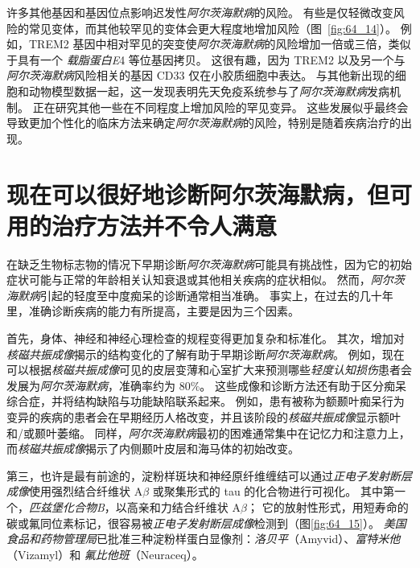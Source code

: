 许多其他基因和基因位点影响迟发性\textit{阿尔茨海默病}的风险。
有些是仅轻微改变风险的常见变体，而其他较罕见的变体会更大程度地增加风险（图~\ref{fig:64_14}）。
例如，TREM2 基因中相对罕见的突变使\textit{阿尔茨海默病}的风险增加一倍或三倍，类似于具有一个 \textit{载脂蛋白E}4 等位基因拷贝。
这很有趣，因为 TREM2 以及另一个与\textit{阿尔茨海默病}风险相关的基因 CD33 仅在小胶质细胞中表达。
与其他新出现的细胞和动物模型数据一起，这一发现表明先天免疫系统参与了\textit{阿尔茨海默病}发病机制。
正在研究其他一些在不同程度上增加风险的罕见变异。
这些发展似乎最终会导致更加个性化的临床方法来确定\textit{阿尔茨海默病}的风险，特别是随着疾病治疗的出现。



\section{现在可以很好地诊断阿尔茨海默病，但可用的治疗方法并不令人满意}

在缺乏生物标志物的情况下早期诊断\textit{阿尔茨海默病}可能具有挑战性，因为它的初始症状可能与正常的年龄相关认知衰退或其他相关疾病的症状相似。
然而，\textit{阿尔茨海默病}引起的轻度至中度痴呆的诊断通常相当准确。
事实上，在过去的几十年里，准确诊断疾病的能力有所提高，主要是因为三个因素。

首先，身体、神经和神经心理检查的规程变得更加复杂和标准化。
其次，增加对\textit{核磁共振成像}揭示的结构变化的了解有助于早期诊断\textit{阿尔茨海默病}。
例如，现在可以根据\textit{核磁共振成像}可见的皮层变薄和心室扩大来预测哪些\textit{轻度认知损伤}患者会发展为\textit{阿尔茨海默病}，准确率约为 80\%。
这些成像和诊断方法还有助于区分痴呆综合症，并将结构缺陷与功能缺陷联系起来。
例如，患有被称为额颞叶痴呆行为变异的疾病的患者会在早期经历人格改变，并且该阶段的\textit{核磁共振成像}显示额叶和/或颞叶萎缩。
同样，\textit{阿尔茨海默病}最初的困难通常集中在记忆力和注意力上，而\textit{核磁共振成像}揭示了内侧颞叶皮层和海马体的初始改变。


第三，也许是最有前途的，淀粉样斑块和神经原纤维缠结可以通过\textit{正电子发射断层成像}使用强烈结合纤维状 A$\beta$ 或聚集形式的 tau 的化合物进行可视化。
其中第一个，\textit{匹兹堡化合物B}，以高亲和力结合纤维状 A$\beta$；
它的放射性形式，用短寿命的碳或氟同位素标记，很容易被\textit{正电子发射断层成像}检测到（图\ref{fig:64_15}）。
\textit{美国食品和药物管理局}已批准三种淀粉样蛋白显像剂：\textit{洛贝平}（Amyvid）、\textit{富特米他}（Vizamyl）和 \textit{氟比他班}（Neuraceq）。


